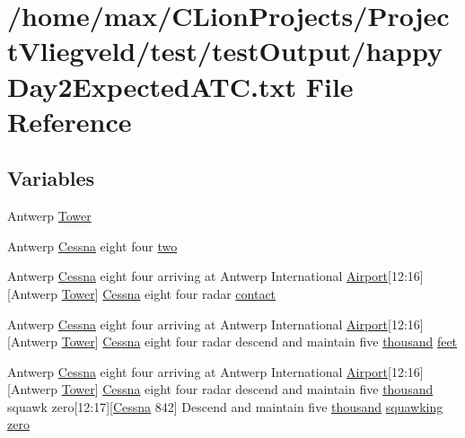 \hypertarget{happyDay2ExpectedATC_8txt}{}\section{/home/max/\+C\+Lion\+Projects/\+Project\+Vliegveld/test/test\+Output/happy\+Day2\+Expected\+A\+TC.txt File Reference}
\label{happyDay2ExpectedATC_8txt}
\subsection*{Variables}
\begin{DoxyCompactItemize}
\item 
Antwerp \hyperlink{happyDay2ExpectedATC_8txt_a53ba8c5e293ec8b769402961740bf7b2}{Tower}
\item 
Antwerp \hyperlink{test_2testOutput_2log_8txt_a3de326468ae3f37941c91ae68853a1af}{Cessna} eight four \hyperlink{happyDay2ExpectedATC_8txt_a8cad909be335793c9a2bc86d42edc8a5}{two}
\item 
Antwerp \hyperlink{test_2testOutput_2log_8txt_a3de326468ae3f37941c91ae68853a1af}{Cessna} eight four arriving at Antwerp International \hyperlink{classAirport}{Airport}\mbox{[}12\+:16\mbox{]}\mbox{[}Antwerp \hyperlink{test_2testOutput_2log_8txt_ade5c2a9317c664c53d015e41bdc32393}{Tower}\mbox{]} \hyperlink{test_2testOutput_2log_8txt_a3de326468ae3f37941c91ae68853a1af}{Cessna} eight four radar \hyperlink{happyDay2ExpectedATC_8txt_aabccce409c3b74e74ea0c068d4a73f10}{contact}
\item 
Antwerp \hyperlink{test_2testOutput_2log_8txt_a3de326468ae3f37941c91ae68853a1af}{Cessna} eight four arriving at Antwerp International \hyperlink{classAirport}{Airport}\mbox{[}12\+:16\mbox{]}\mbox{[}Antwerp \hyperlink{test_2testOutput_2log_8txt_ade5c2a9317c664c53d015e41bdc32393}{Tower}\mbox{]} \hyperlink{test_2testOutput_2log_8txt_a3de326468ae3f37941c91ae68853a1af}{Cessna} eight four radar descend and maintain five \hyperlink{happyDay5ExpectedATC_8txt_a429913a0643fe14faca3dca538caa7bb}{thousand} \hyperlink{happyDay2ExpectedATC_8txt_adb5a296986a5b6019ec88f520f243c26}{feet}
\item 
Antwerp \hyperlink{test_2testOutput_2log_8txt_a3de326468ae3f37941c91ae68853a1af}{Cessna} eight four arriving at Antwerp International \hyperlink{classAirport}{Airport}\mbox{[}12\+:16\mbox{]}\mbox{[}Antwerp \hyperlink{test_2testOutput_2log_8txt_ade5c2a9317c664c53d015e41bdc32393}{Tower}\mbox{]} \hyperlink{test_2testOutput_2log_8txt_a3de326468ae3f37941c91ae68853a1af}{Cessna} eight four radar descend and maintain five \hyperlink{happyDay5ExpectedATC_8txt_a429913a0643fe14faca3dca538caa7bb}{thousand} squawk zero\mbox{[}12\+:17\mbox{]}\mbox{[}\hyperlink{test_2testOutput_2log_8txt_a3de326468ae3f37941c91ae68853a1af}{Cessna} 842\mbox{]} Descend and maintain five \hyperlink{happyDay5ExpectedATC_8txt_a429913a0643fe14faca3dca538caa7bb}{thousand} \hyperlink{test_2testOutput_2log_8txt_a890147ec88e2d9518adf949981616843}{squawking} \hyperlink{happyDay2ExpectedATC_8txt_adce466d7618784129bcb0feb6d2d98e4}{zero}

\end{DoxyCompactItemize}
